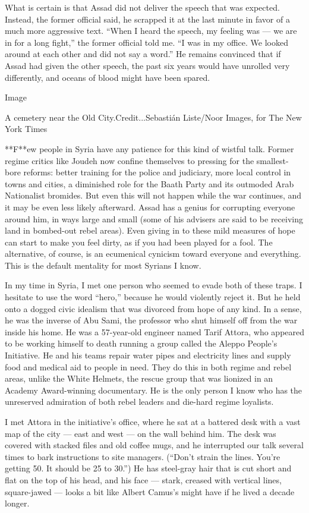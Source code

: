 What is certain is that Assad did not deliver the speech that was
expected. Instead, the former official said, he scrapped it at the last
minute in favor of a much more aggressive text. ``When I heard the
speech, my feeling was --- we are in for a long fight,'' the former
official told me. ``I was in my office. We looked around at each other
and did not say a word.'' He remains convinced that if Assad had given
the other speech, the past six years would have unrolled very
differently, and oceans of blood might have been spared.

Image

A cemetery near the Old City.Credit...Sebastián Liste/Noor Images, for
The New York Times

**F**ew people in Syria have any patience for this kind of wistful talk.
Former regime critics like Joudeh now confine themselves to pressing for
the smallest-bore reforms: better training for the police and judiciary,
more local control in towns and cities, a diminished role for the Baath
Party and its outmoded Arab Nationalist bromides. But even this will not
happen while the war continues, and it may be even less likely
afterward. Assad has a genius for corrupting everyone around him, in
ways large and small (some of his advisers are said to be receiving land
in bombed-out rebel areas). Even giving in to these mild measures of
hope can start to make you feel dirty, as if you had been played for a
fool. The alternative, of course, is an ecumenical cynicism toward
everyone and everything. This is the default mentality for most Syrians
I know.

In my time in Syria, I met one person who seemed to evade both of these
traps. I hesitate to use the word ``hero,'' because he would violently
reject it. But he held onto a dogged civic idealism that was divorced
from hope of any kind. In a sense, he was the inverse of Abu Sami, the
professor who shut himself off from the war inside his home. He was a
57-year-old engineer named Tarif Attora, who appeared to be working
himself to death running a group called the Aleppo People's Initiative.
He and his teams repair water pipes and electricity lines and supply
food and medical aid to people in need. They do this in both regime and
rebel areas, unlike the White Helmets, the rescue group that was
lionized in an Academy Award-winning documentary. He is the only person
I know who has the unreserved admiration of both rebel leaders and
die-hard regime loyalists.

I met Attora in the initiative's office, where he sat at a battered desk
with a vast map of the city --- east and west --- on the wall behind
him. The desk was covered with stacked files and old coffee mugs, and he
interrupted our talk several times to bark instructions to site
managers. (``Don't strain the lines. You're getting 50. It should be 25
to 30.'') He has steel-gray hair that is cut short and flat on the top
of his head, and his face --- stark, creased with vertical lines,
square-jawed --- looks a bit like Albert Camus's might have if he lived
a decade longer.


